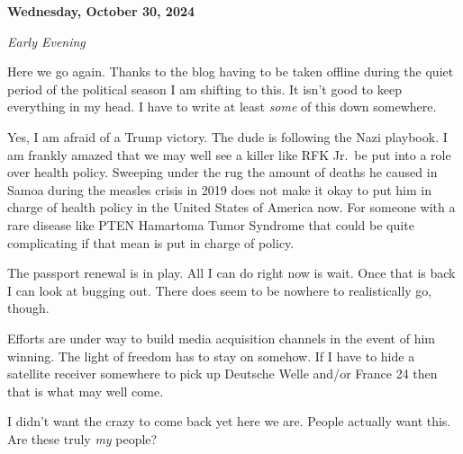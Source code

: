 \textbf{Wednesday, October 30, 2024}

\emph{Early Evening}

Here we go again. Thanks to the blog having to be taken offline during
the quiet period of the political season I am shifting to this. It isn't
good to keep everything in my head. I have to write at least \emph{some}
of this down somewhere.

Yes, I am afraid of a Trump victory. The dude is following the Nazi
playbook. I am frankly amazed that we may well see a killer like RFK
Jr.~be put into a role over health policy. Sweeping under the rug the
amount of deaths he caused in Samoa during the measles crisis in 2019
does not make it okay to put him in charge of health policy in the
United States of America now. For someone with a rare disease like PTEN
Hamartoma Tumor Syndrome that could be quite complicating if that mean
is put in charge of policy.

The passport renewal is in play. All I can do right now is wait. Once
that is back I can look at bugging out. There does seem to be nowhere to
realistically go, though.

Efforts are under way to build media acquisition channels in the event
of him winning. The light of freedom has to stay on somehow. If I have
to hide a satellite receiver somewhere to pick up Deutsche Welle and/or
France 24 then that is what may well come.

I didn't want the crazy to come back yet here we are. People actually
want this. Are these truly \emph{my} people?
